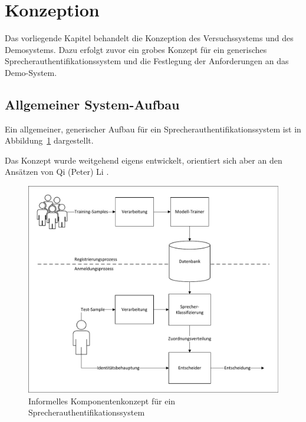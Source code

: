 \section{Konzeption}\label{sec:Konzeption}

Das vorliegende Kapitel behandelt die Konzeption des Versuchssystems und des Demosystems.
Dazu erfolgt zuvor ein grobes Konzept für ein generisches Sprecherauthentifikationssystem und die Festlegung der Anforderungen an das Demo-System.

\subsection{Allgemeiner System-Aufbau}

Ein allgemeiner, generischer Aufbau für ein Sprecherauthentifikationssystem ist in Abbildung~\ref{fig:allg-generisch-aufbau} dargestellt.

Das Konzept wurde weitgehend eigens entwickelt, orientiert sich aber an den Ansätzen von Qi (Peter) Li \autocite[vgl. ][S. 7]{li_speaker_2012}.

\begin{figure}[H]
    \centering
    \includegraphics[width=\textwidth, keepaspectratio]{images/allg-generisch-aufbau.pdf}
    \caption{Informelles Komponentenkonzept für ein Sprecherauthentifikationssystem}
    \label{fig:allg-generisch-aufbau}
\end{figure}\noindent

